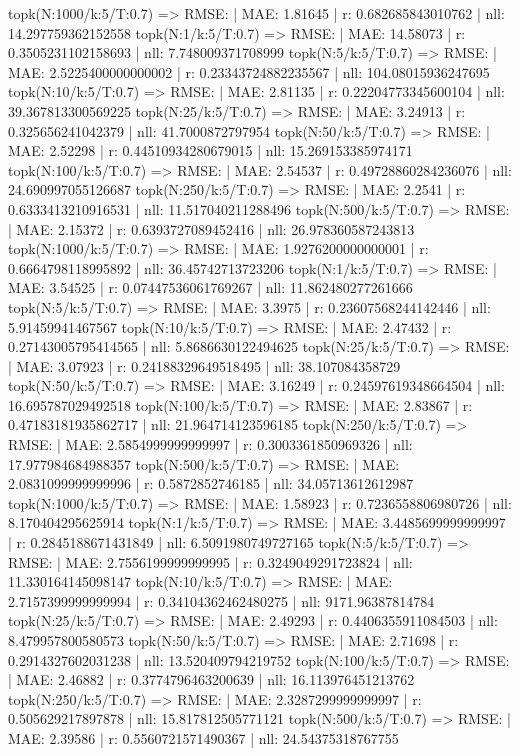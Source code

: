 topk(N:1000/k:5/T:0.7) => RMSE: | MAE: 1.81645 | r: 0.682685843010762 | nll: 14.297759362152558
topk(N:1/k:5/T:0.7) => RMSE: | MAE: 14.58073 | r: 0.3505231102158693 | nll: 7.748009371708999
topk(N:5/k:5/T:0.7) => RMSE: | MAE: 2.5225400000000002 | r: 0.23343724882235567 | nll: 104.08015936247695
topk(N:10/k:5/T:0.7) => RMSE: | MAE: 2.81135 | r: 0.22204773345600104 | nll: 39.367813300569225
topk(N:25/k:5/T:0.7) => RMSE: | MAE: 3.24913 | r: 0.325656241042379 | nll: 41.7000872797954
topk(N:50/k:5/T:0.7) => RMSE: | MAE: 2.52298 | r: 0.44510934280679015 | nll: 15.269153385974171
topk(N:100/k:5/T:0.7) => RMSE: | MAE: 2.54537 | r: 0.49728860284236076 | nll: 24.690997055126687
topk(N:250/k:5/T:0.7) => RMSE: | MAE: 2.2541 | r: 0.6333413210916531 | nll: 11.517040211288496
topk(N:500/k:5/T:0.7) => RMSE: | MAE: 2.15372 | r: 0.6393727089452416 | nll: 26.978360587243813
topk(N:1000/k:5/T:0.7) => RMSE: | MAE: 1.9276200000000001 | r: 0.6664798118995892 | nll: 36.45742713723206
topk(N:1/k:5/T:0.7) => RMSE: | MAE: 3.54525 | r: 0.07447536061769267 | nll: 11.862480277261666
topk(N:5/k:5/T:0.7) => RMSE: | MAE: 3.3975 | r: 0.23607568244142446 | nll: 5.91459941467567
topk(N:10/k:5/T:0.7) => RMSE: | MAE: 2.47432 | r: 0.27143005795414565 | nll: 5.8686630122494625
topk(N:25/k:5/T:0.7) => RMSE: | MAE: 3.07923 | r: 0.24188329649518495 | nll: 38.107084358729
topk(N:50/k:5/T:0.7) => RMSE: | MAE: 3.16249 | r: 0.24597619348664504 | nll: 16.695787029492518
topk(N:100/k:5/T:0.7) => RMSE: | MAE: 2.83867 | r: 0.47183181935862717 | nll: 21.964714123596185
topk(N:250/k:5/T:0.7) => RMSE: | MAE: 2.5854999999999997 | r: 0.3003361850969326 | nll: 17.977984684988357
topk(N:500/k:5/T:0.7) => RMSE: | MAE: 2.0831099999999996 | r: 0.5872852746185 | nll: 34.05713612612987
topk(N:1000/k:5/T:0.7) => RMSE: | MAE: 1.58923 | r: 0.7236558806980726 | nll: 8.170404295625914
topk(N:1/k:5/T:0.7) => RMSE: | MAE: 3.4485699999999997 | r: 0.2845188671431849 | nll: 6.5091980749727165
topk(N:5/k:5/T:0.7) => RMSE: | MAE: 2.7556199999999995 | r: 0.3249049291723824 | nll: 11.330164145098147
topk(N:10/k:5/T:0.7) => RMSE: | MAE: 2.7157399999999994 | r: 0.34104362462480275 | nll: 9171.96387814784
topk(N:25/k:5/T:0.7) => RMSE: | MAE: 2.49293 | r: 0.4406355911084503 | nll: 8.479957800580573
topk(N:50/k:5/T:0.7) => RMSE: | MAE: 2.71698 | r: 0.2914327602031238 | nll: 13.520409794219752
topk(N:100/k:5/T:0.7) => RMSE: | MAE: 2.46882 | r: 0.3774796463200639 | nll: 16.113976451213762
topk(N:250/k:5/T:0.7) => RMSE: | MAE: 2.3287299999999997 | r: 0.505629217897878 | nll: 15.817812505771121
topk(N:500/k:5/T:0.7) => RMSE: | MAE: 2.39586 | r: 0.5560721571490367 | nll: 24.54375318767755
